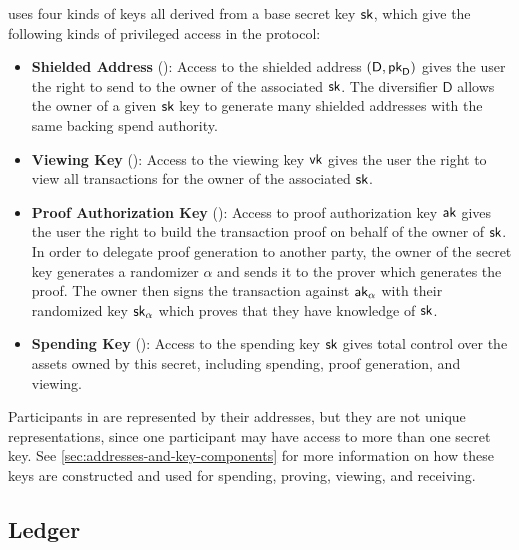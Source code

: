 \MantaPay{} uses four kinds of keys all derived from a base secret key ${\textsf{sk}}$, which give the following kinds of privileged access in the protocol:

\begin{itemize}
    \item \textbf{Shielded Address} (\send{}): Access to the shielded address $(\textsf{D}, {\textsf{pk}}_\textsf{D})$ gives the user the right to send  to the owner of the associated ${\textsf{sk}}$. The diversifier $\textsf{D}$ allows the owner of a given ${\textsf{sk}}$ key to generate many shielded addresses with the same backing spend authority.
    \item \textbf{Viewing Key} (\view{}): Access to the viewing key ${\textsf{vk}}$ gives the user the right to view all transactions for the owner of the associated ${\textsf{sk}}$.
    \item \textbf{Proof Authorization Key} (\prove{}): Access to proof authorization key ${\textsf{ak}}$ gives the user the right to build the transaction proof on behalf of the owner of ${\textsf{sk}}$. In order to delegate proof generation to another party, the owner of the secret key generates a randomizer $\alpha$ and sends it to the prover which generates the proof. The owner then signs the transaction against ${\textsf{ak}}_\alpha$ with their randomized key ${\textsf{sk}}_\alpha$ which proves that they have knowledge of ${\textsf{sk}}$.
    \item \textbf{Spending Key} (\spend{}): Access to the spending key ${\textsf{sk}}$ gives total control over the assets owned by this secret, including spending, proof generation, and viewing.
\end{itemize}

Participants in \MantaPay{} are represented by their addresses, but they are not unique representations, since one participant may have access to more than one secret key. See \autoref{sec:addresses-and-key-components} for more information on how these keys are constructed and used for spending, proving, viewing, and receiving.

\subsection{Ledger}

